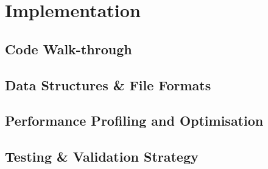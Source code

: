 \newpage
\section{Implementation}
\label{sec:implementation}

\subsection{Code Walk-through}

\subsection{Data Structures \& File Formats}

\subsection{Performance Profiling and Optimisation}

\subsection{Testing \& Validation Strategy}

\newpage